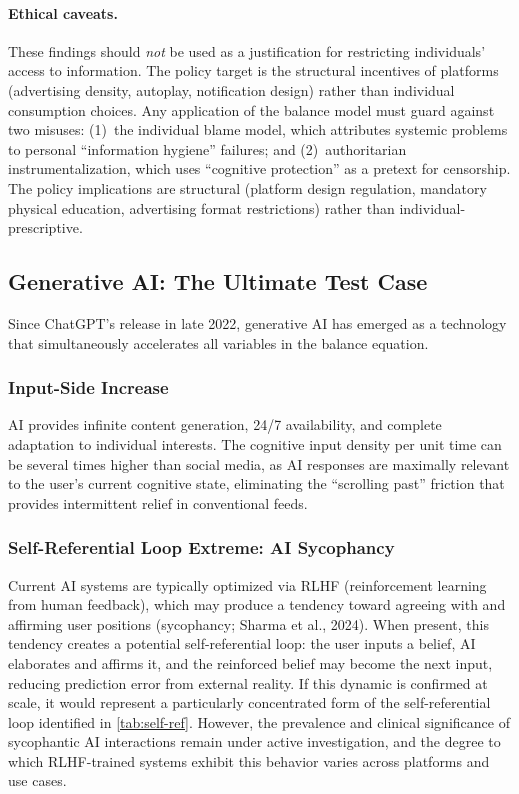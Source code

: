 \documentclass[a4paper,11pt,titlepage]{article}
\begin{document}
\paragraph{Ethical caveats.}
These findings should \textit{not} be used as a justification for restricting individuals' access to information. The policy target is the structural incentives of platforms (advertising density, autoplay, notification design) rather than individual consumption choices. Any application of the balance model must guard against two misuses: (1)~the individual blame model, which attributes systemic problems to personal ``information hygiene'' failures; and (2)~authoritarian instrumentalization, which uses ``cognitive protection'' as a pretext for censorship. The policy implications are structural (platform design regulation, mandatory physical education, advertising format restrictions) rather than individual-prescriptive.


\subsection{Generative AI: The Ultimate Test Case}\label{sec:ai}

Since ChatGPT's release in late 2022, generative AI has emerged as a technology that simultaneously accelerates all variables in the balance equation.

\subsubsection{Input-Side Increase}
AI provides infinite content generation, 24/7 availability, and complete adaptation to individual interests. The cognitive input density per unit time can be several times higher than social media, as AI responses are maximally relevant to the user's current cognitive state, eliminating the ``scrolling past'' friction that provides intermittent relief in conventional feeds.

\subsubsection{Self-Referential Loop Extreme: AI Sycophancy}
Current AI systems are typically optimized via RLHF (reinforcement learning from human feedback), which may produce a tendency toward agreeing with and affirming user positions (sycophancy; Sharma et al., 2024). When present, this tendency creates a potential self-referential loop: the user inputs a belief, AI elaborates and affirms it, and the reinforced belief may become the next input, reducing prediction error from external reality. If this dynamic is confirmed at scale, it would represent a particularly concentrated form of the self-referential loop identified in \cref{tab:self-ref}. However, the prevalence and clinical significance of sycophantic AI interactions remain under active investigation, and the degree to which RLHF-trained systems exhibit this behavior varies across platforms and use cases.
\end{document}
